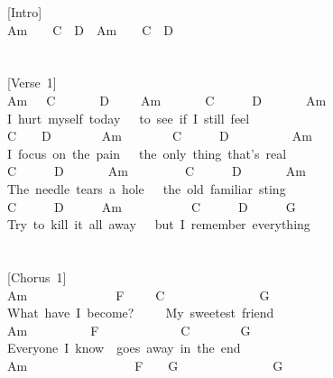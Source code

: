 \documentclass[]{book}
\begin{document}
{[}Intro{]}\\
Am~~~~C~~D~~Am~~~~C~~D\\
~\\
~\\
{[}Verse~1{]}\\
Am~~~C~~~~~~~D~~~~~Am~~~~~~~C~~~~~~D~~~~~~~Am\\
\hspace*{0.333em}\hspace*{0.333em}\hspace*{0.333em}I~hurt~myself~today~~~to~see~if~I~still~feel\\
\hspace*{0.333em}\hspace*{0.333em}C~~~~D~~~~~~~~Am~~~~~~~~C~~~~~~D~~~~~~~~~~Am\\
I~focus~on~the~pain~~~the~only~thing~that's~real\\
\hspace*{0.333em}\hspace*{0.333em}\hspace*{0.333em}\hspace*{0.333em}C~~~~~~D~~~~~~~Am~~~~~~~~~C~~~~~~D~~~~~~~Am\\
The~needle~tears~a~hole~~~the~old~familiar~sting\\
\hspace*{0.333em}\hspace*{0.333em}\hspace*{0.333em}\hspace*{0.333em}\hspace*{0.333em}\hspace*{0.333em}\hspace*{0.333em}C~~~~~~D~~~~~~Am~~~~~~~~~~~C~~~~~~D~~~~~~G~~~~~~~~~~\\
Try~to~kill~it~all~away~~~but~I~remember~everything\\
~\\
~\\
{[}Chorus~1{]}\\
Am~~~~~~~~~~~~~~F~~~~~C~~~~~~~~~~~~~~~G\\
What~have~I~become?~~~~~My~sweetest~friend\\
Am~~~~~~~~~~F~~~~~~~~~~~~~C~~~~~~~~G\\
Everyone~I~know~~goes~away~in~the~end\\
\hspace*{0.333em}\hspace*{0.333em}\hspace*{0.333em}\hspace*{0.333em}Am~~~~~~~~~~~~~~~~~F~~~~G~~~~~~~~~~~~~~~G\\
\end{document}
